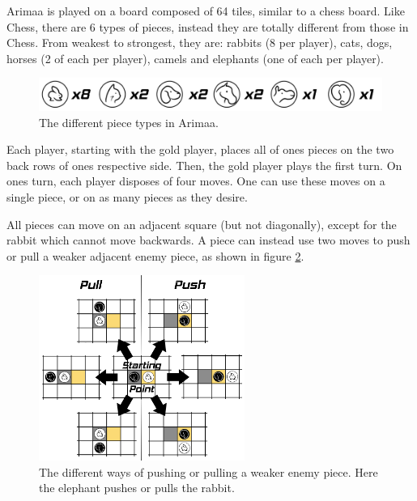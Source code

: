 \label{first part}
Arimaa is played on a board composed of 64 tiles, similar to a chess board. Like Chess, there are 6 types of pieces, instead they are totally different from those in Chess. From weakest to strongest, they are: rabbits (8 per player), cats, dogs, horses (2 of each per player), camels and elephants (one of each per player).%

\begin{figure}[!h]
\centering
\includegraphics[width=\textwidth]{1_Presentation/1.1_Arimaa_rules_Gabriel/Pictures/Pieces.png}
\caption{The different piece types in Arimaa.}
\label{fig:pieces}
\end{figure}

Each player, starting with the gold player, places all of ones pieces on the two back rows of ones respective side. Then, the gold player plays the first turn.
On ones turn, each player disposes of four moves. One can use these moves on a single piece, or on as many pieces as they desire.

All pieces can move on an adjacent square (but not diagonally), except for the rabbit which cannot move backwards.
A piece can instead use two moves to push or pull a weaker adjacent enemy piece, as shown in figure \ref{fig:displace}.

\begin{figure}[!h]
\centering
\includegraphics[width=0.6\textwidth]{1_Presentation/1.1_Arimaa_rules_Gabriel/Pictures/Displace.png}
\caption[The different ways of pushing or pulling a weaker enemy piece.]{The different ways of pushing or pulling a weaker enemy piece. Here the elephant pushes or pulls the rabbit.}
\label{fig:displace}
\end{figure}

